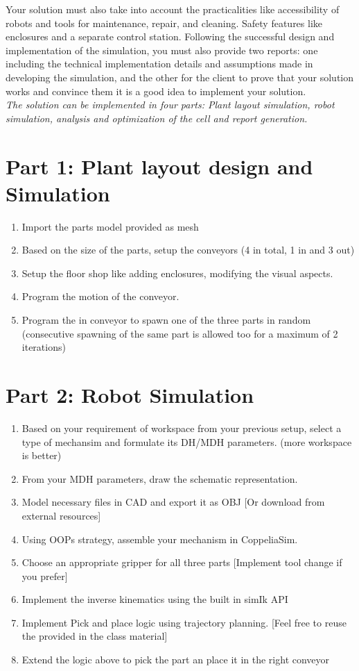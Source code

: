 \documentclass[12pt, a4paper]{article}
\begin{document}
Your solution must also take into account the practicalities like accessibility of robots and tools for maintenance, repair, and cleaning. Safety features like enclosures and a separate control station. Following the successful design and implementation of the simulation, you must also provide two reports: one including the technical implementation details and assumptions made in developing the simulation, and the other for the client to prove that your solution works and convince them it is a good idea to implement your solution. 
\\[1cm]
\emph{The solution can be implemented in four parts: Plant layout simulation, robot simulation, analysis and optimization of the cell and report generation. }

\section*{Part 1: Plant layout design and Simulation} %
\begin{enumerate}
    \item Import the parts model provided as mesh
    \item Based on the size of the parts, setup the conveyors (4 in total, 1 in and 3 out)
    \item Setup the floor shop like adding enclosures, modifying the visual aspects. 
    \item Program the motion of the conveyor. 
    \item Program the in conveyor to spawn one of the three parts in random (consecutive spawning of the same part is allowed too for a maximum of 2 iterations)
\end{enumerate}

\section*{Part 2: Robot Simulation} %
\begin{enumerate}
    \item Based on your requirement of workspace from your previous setup, select a type of mechansim and formulate its DH/MDH parameters. (more workspace is better)
    \item From your MDH parameters, draw the schematic representation.
    \item Model necessary files in CAD and export it as OBJ [Or download from external resources]
    \item Using OOPs strategy, assemble your mechanism in CoppeliaSim.
    \item Choose an appropriate gripper for all three parts [Implement tool change if you prefer]
    \item Implement the inverse kinematics using the built in simIk API
    \item Implement Pick and place logic using trajectory planning. [Feel free to reuse the provided in the class material]
    \item Extend the logic above to pick the part an place it in the right conveyor
\end{enumerate}
\end{document}
